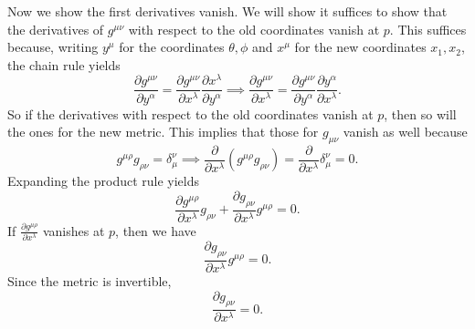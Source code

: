 \documentclass[11pt, letterpaper]{article}
\begin{document}
Now we show the first derivatives vanish. We will show it suffices to show that the derivatives of $g^{\mu \nu } $ with respect to the old coordinates vanish at $p$. This suffices because, writing $y^\mu $ for the coordinates $\theta ,\phi $ and $x^\mu $ for the new coordinates $x_1,x_2$, the chain rule yields
\[
	\frac{\partial g^{\mu \nu } }{\partial y^\alpha } =\frac{\partial g^{\mu \nu } }{\partial x^\lambda } \frac{\partial x^\lambda }{\partial y^\alpha }  \implies \frac{\partial g^{\mu \nu } }{\partial x^\lambda } =\frac{\partial g^{\mu \nu } }{\partial y^\alpha } \frac{\partial y^\alpha }{\partial x^\lambda } 
.\]
So if the derivatives with respect to the old coordinates vanish at $p$, then so will the ones for the new metric. This implies that those for $g_{\mu \nu }$ vanish as well because
\[
	g^{\mu \rho } g_{\rho \nu } =\delta _\mu ^\nu  \implies \frac{\partial }{\partial x^\lambda } \left( g^{\mu \rho } g_{\rho \nu }  \right) =\frac{\partial }{\partial x^\lambda } \delta _\mu ^\nu =0
.\]
Expanding the product rule yields
\[
	\frac{\partial g^{\mu \rho } }{\partial x^\lambda } g_{\rho \nu } +\frac{\partial g_{\rho \nu } }{\partial x^\lambda } g^{\mu \rho } =0
.\]
If $\frac{\partial g^{\mu \rho } }{\partial x^\lambda } $ vanishes at $p$, then we have
\[
	\frac{\partial g_{\rho \nu } }{\partial x^\lambda } g^{\mu \rho } =0
.\]
Since the metric is invertible,
\[
	\frac{\partial g_{\rho \nu } }{\partial x^\lambda } =0
.\]
\end{document}

